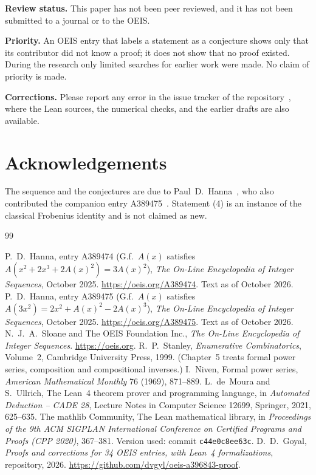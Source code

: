 \documentclass[11pt,a4paper]{article}
\theoremstyle{definition}
\theoremstyle{remark}
\newcommand{\para}[1]{\par\medskip\noindent\textbf{#1}\enspace}
\begin{document}
\para{Review status.} This paper has not been peer reviewed, and it has not been submitted to a journal or to the OEIS.

\para{Priority.} An OEIS entry that labels a statement as a conjecture shows only that its contributor did not know
a proof; it does not show that no proof existed. During the research only limited searches for earlier work were
made. No claim of priority is made.

\para{Corrections.} Please report any error in the issue tracker of the repository~\cite{repo}, where the Lean
sources, the numerical checks, and the earlier drafts are also available.

\section*{Acknowledgements}
The sequence and the conjectures are due to Paul~D.~Hanna~\cite{oeis}, who also contributed the companion entry
A389475~\cite{oeisother}. Statement (4) is an instance of the classical Frobenius identity and is not claimed as new.

\begin{thebibliography}{99}\small
\raggedright
{} P.~D.~Hanna, entry A389474 (G.f.\ $A(x)$ satisfies $A(x^2+2x^3+2A(x)^2)=3A(x)^2$), \emph{The On-Line Encyclopedia of Integer Sequences}, October 2025. \url{https://oeis.org/A389474}. Text as of October 2026.
 P.~D.~Hanna, entry A389475 (G.f.\ $A(x)$ satisfies $A(3x^2)=2x^2+A(x)^2-2A(x)^3$), \emph{The On-Line Encyclopedia of Integer Sequences}, October 2025. \url{https://oeis.org/A389475}. Text as of October 2026.
 N.~J.~A.~Sloane and The OEIS Foundation Inc., \emph{The On-Line Encyclopedia of Integer Sequences}. \url{https://oeis.org}.
 R.~P.~Stanley, \emph{Enumerative Combinatorics}, Volume~2, Cambridge University Press, 1999. (Chapter~5 treats formal power series, composition and compositional inverses.)
 I.~Niven, Formal power series, \emph{American Mathematical Monthly} 76 (1969), 871--889.
 L.~de~Moura and S.~Ullrich, The Lean~4 theorem prover and programming language, in \emph{Automated Deduction -- CADE 28}, Lecture Notes in Computer Science 12699, Springer, 2021, 625--635.
 The mathlib Community, The Lean mathematical library, in \emph{Proceedings of the 9th ACM SIGPLAN International Conference on Certified Programs and Proofs (CPP 2020)}, 367--381. Version used: commit \texttt{c44e0c8ee63c}.
 D.~D.~Goyal, \emph{Proofs and corrections for 34 OEIS entries, with Lean~4 formalizations}, repository, 2026. \url{https://github.com/dvgyl/oeis-a396843-proof}.
\end{thebibliography}
\end{document}
